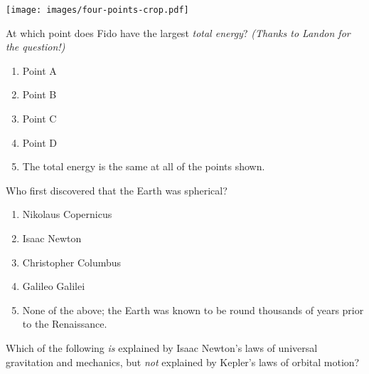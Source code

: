 \documentclass[12pt]{article}
\def\BS{\bigskip}
\newcommand{\BC}{\begin{center}}
\newcommand{\EC}{\end{center}}
\begin{document}
\begin{enumerate}
\begin{minipage}{\textwidth}
{\BS
\BC
\texttt{[image: images/four-points-crop.pdf]}
\EC
\BS

At which point does Fido have the largest {\it total energy}? {\it (Thanks to Landon for the question!)}

\begin{enumerate}[label=(\Alph*)]
\setlength\itemsep{0.0em}
\item{ Point A }
\item{ Point B }
\item{ Point C }
\item{ Point D }
\item{ The total energy is the same at all of the points shown. }
\end{enumerate}
} %
\end{minipage}


\vspace{0.5in}

\begin{minipage}{\textwidth}
\item{Who first discovered that the Earth was spherical?

\begin{enumerate}[label=(\Alph*)]
\setlength\itemsep{0.0em}
\item{ Nikolaus Copernicus }
\item{ Isaac Newton }
\item{ Christopher Columbus }
\item{ Galileo Galilei }
\item{ None of the above; the Earth was known to be round thousands of years prior to the Renaissance. }
\end{enumerate}
} %
\end{minipage}


\vspace{0.5in}

\begin{minipage}{\textwidth}
\item{Which of the following {\it is} explained by Isaac Newton's laws of universal gravitation and mechanics, but {\it not} explained
by Kepler's laws of orbital motion?

}
\end{minipage}
\end{enumerate}
\end{document}
